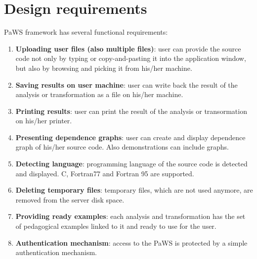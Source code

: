 \section{Design requirements}
\label{design_requirements}

PaWS framework has several functional requirements:

\begin{enumerate}
  \item {\bf Uploading user files (also multiple files)}\label{req:uploading_files}: user can provide the source code not only by typing or copy-and-pasting it into the application window, but also by browsing and picking it from his/her machine.
  \item {\bf Saving results on user machine}\label{req:saving_results}: user can write back the result of the analysis or transformation as a file on his/her machine.
  \item {\bf Printing results}\label{req:printing_results}: user can print the result of the analysis or transormation on his/her printer.
  \item {\bf Presenting dependence graphs}\label{req:dependence_graphs}: user can create and display dependence graph of his/her source code. Also demonstrations can include graphs.
  \item {\bf Detecting language}\label{req:language_detection}: programming language of the source code is detected and displayed. C, Fortran77 and Fortran 95 are supported.
  \item {\bf Deleting temporary files}\label{req:deleting_files}: temporary files, which are not used anymore, are removed from the server disk space.
  \item {\bf Providing ready examples}\label{req:providing_examples}: each analysis and transformation has the set of pedagogical examples linked to it and ready to use for the user.
  \item {\bf Authentication mechanism}\label{req:authentication}: access to the PaWS is protected by a simple authentication mechanism.
\end{enumerate}